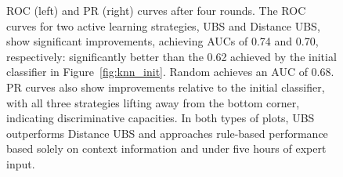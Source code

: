 \begin{figure}
\caption{ROC (left) and PR (right) curves after four rounds. 
The ROC curves for two active learning strategies, UBS and Distance UBS, show significant improvements,
achieving AUCs of 0.74 and 0.70, respectively: significantly better than the 0.62 achieved by the initial
classifier in Figure~\ref{fig:knn_init}. 
Random achieves an AUC of 0.68.
PR curves also show improvements relative to the initial classifier, with all three strategies
lifting away from the bottom corner, indicating discriminative capacities.
In both types of plots, UBS outperforms Distance UBS and approaches rule-based performance based solely on context information and under five hours of expert input.
}\label{fig:rocs_prcs_round5}\label{fig:prcs_round5}
\end{figure}

